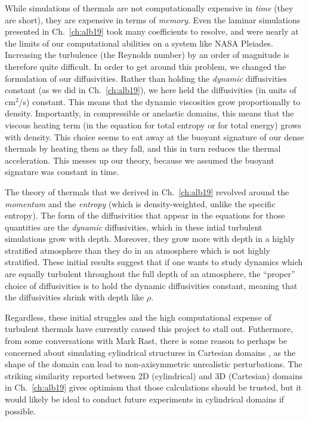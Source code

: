 While simulations of thermals are not computationally expensive in \emph{time} (they are short), they are expensive in terms of \emph{memory}.
Even the laminar simulations presented in Ch.~\ref{ch:alb19} took many coefficients to resolve, and were nearly at the limits of our computational abilities on a system like NASA Pleiades.
Increasing the turbulence (the Reynolds number) by an order of magnitude is therefore quite difficult.
In order to get around this problem, we changed the formulation of our diffusivities.
Rather than holding the \emph{dynamic} diffusivities constant (as we did in Ch.~\ref{ch:alb19}), we here held the diffusivities (in units of cm$^2$/s) constant.
This means that the dynamic viscosities grow proportionally to density.
Importantly, in compressible or anelastic domains, this means that the viscous heating term (in the equation for total entropy or for total energy) grows with density.
This choice seems to eat away at the buoyant signature of our dense thermals by heating them as they fall, and this in turn reduces the thermal acceleration.
This messes up our theory, because we assumed the buoyant signature was constant in time.

The theory of thermals that we derived in Ch.~\ref{ch:alb19} revolved around the \emph{momentum} and the \emph{entropy} (which is density-weighted, unlike the specific entropy).
The form of the diffusivities that appear in the equations for those quantities are the \emph{dynamic} diffusivities, which in these intial turbulent simulations grow with depth.
Moreover, they grow more with depth in a highly stratified atmosphere than they do in an atmosphere which is not highly stratified.
These initial results suggest that if one wants to study dynamics which are equally turbulent throughout the full depth of an atmosphere, the ``proper'' choice of diffusivities is to hold the dynamic diffusivities constant, meaning that the diffusivities shrink with depth like $\rho$.

Regardless, these initial struggles and the high computational expense of turbulent thermals have currently caused this project to stall out.
Futhermore, from some conversations with Mark Rast, there is some reason to perhaps be concerned about simulating cylindrical structures in Cartesian domains \citep[see e.g., Fig.~9 of][]{clyne&all2007}, as the shape of the domain can lead to non-axisymmetric unrealistic perturbations.
The striking similarity reported between 2D (cylindrical) and 3D (Cartesian) domains in Ch.~\ref{ch:alb19} gives optimism that those calculations should be trusted, but it would likely be ideal to conduct future experiments in cylindrical domains if possible.


